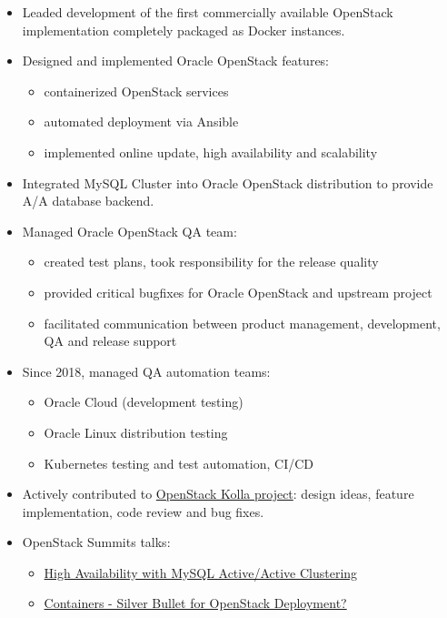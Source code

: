 \documentclass[a4paper,12pt,]{article}
\begin{document}
\begin{description}
    \begin{itemize}

    \item Leaded development of the first commercially available OpenStack implementation completely packaged as Docker instances.

    \item Designed and implemented Oracle OpenStack features:
        \begin{itemize}
        \item containerized OpenStack services
        \item automated deployment via Ansible
        \item implemented online update, high availability and scalability
        \end{itemize}

    \item Integrated MySQL Cluster into Oracle OpenStack distribution to provide A/A database backend.

    \item Managed Oracle OpenStack QA team:
        \begin{itemize}
        \item created test plans, took responsibility for the release quality
        \item provided critical bugfixes for Oracle OpenStack and upstream project
        \item facilitated communication between product management, development, QA and release support
		\end{itemize}

    \item Since 2018, managed QA automation teams:
        \begin{itemize}
        \item Oracle Cloud (development testing)
        \item Oracle Linux distribution testing
        \item Kubernetes testing and test automation, CI/CD
        \end{itemize}

    \item Actively contributed to \href{https://docs.openstack.org/developer/kolla-ansible}{OpenStack Kolla project}: design ideas, feature implementation, code review and bug fixes.

    \item OpenStack Summits talks:
       \begin{itemize}
       \item \href{https://youtu.be/RJf7cwkytOE}{High Availability with MySQL Active/Active Clustering}
       \item \href{https://youtu.be/wzN3RHnVWdQ}{Containers - Silver Bullet for OpenStack Deployment?}
       \end{itemize}
    \end{itemize}


\end{description}
\end{document}
